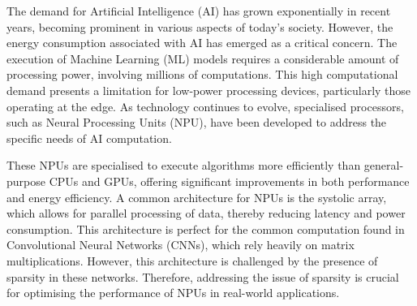 \documentclass[12pt, a4paper, ukenglish]{article}
\begin{document}
    The demand for Artificial Intelligence (AI) has grown exponentially in recent years, becoming prominent in various aspects of today's society. However, the energy consumption associated with AI has emerged as a critical concern. The execution of Machine Learning (ML) models requires a considerable amount of processing power, involving millions of computations. This high computational demand presents a limitation for low-power processing devices, particularly those operating at the edge. As technology continues to evolve, specialised processors, such as Neural Processing Units (NPU), have been developed to address the specific needs of AI computation. 

    These NPUs are specialised to execute algorithms more efficiently than general-purpose CPUs and GPUs, offering significant improvements in both performance and energy efficiency. A common architecture for NPUs is the systolic array, which allows for parallel processing of data, thereby reducing latency and power consumption. This architecture is perfect for the common computation found in Convolutional Neural Networks (CNNs), which rely heavily on matrix multiplications. However, this architecture is challenged by the presence of sparsity in these networks. Therefore, addressing the issue of sparsity is crucial for optimising the performance of NPUs in real-world applications.
\end{document}
